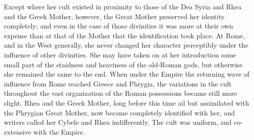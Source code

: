 \documentclass[a4paper, 11pt, oneside, polutonikogreek, french]{article}
\begin{document}
Except where her cult existed in proximity to those of the Dea Syria and Rhea and the Greek Mother, however, the Great Mother preserved her identity completely; and even in the case of those divinities it was more at their own expense than at that of the Mother that the identification took place. At Rome, and in the West generally, she never changed her character perceptibly under the influence of other divinities. She may have taken on at her introduction some small part of the staidness and heaviness of the old-Roman gods, but otherwise she remained the same to the end. When under the Empire the returning wave of influence from Rome reached Greece and Phrygia, the variations in the cult throughout the vast organization of the Roman possessions became still more slight. Rhea and the Greek Mother, long before this time ail but assimilated with the Phrygian Great Mother, now became completely identified with her, and writers called her Cybele and Rhea indifferently. The cult was uniform, and co-extensive with the Empire.
\end{document}
